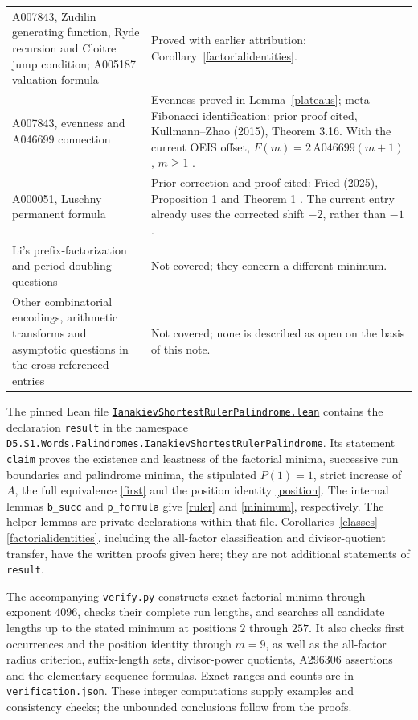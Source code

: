 \documentclass[11pt]{article}
\begin{document}
\begin{longtable}{@{}p{}p{}@{}}
A007843, Zudilin generating function, Ryde recursion and Cloitre jump
condition; A005187 valuation formula
& Proved with earlier attribution: Corollary~\ref{factorialidentities}.\\
A007843, evenness and A046699 connection
& Evenness proved in Lemma~\ref{plateaus}; meta-Fibonacci identification:
prior proof cited, Kullmann--Zhao (2015), Theorem 3.16.
With the current OEIS offset, $F(m)=2\,\mathrm{A046699}(m+1)$,
$m\ge1$ \cite{oeisF}.\\
A000051, Luschny permanent formula
& Prior correction and proof cited: Fried (2025), Proposition 1
and Theorem 1 \cite{friedPermanent}. The current entry already
uses the corrected shift $-2$, rather than $-1$.\\
Li's prefix-factorization and period-doubling questions
& Not covered; they concern a different minimum.\\
Other combinatorial encodings, arithmetic transforms and asymptotic
questions in the cross-referenced entries
& Not covered; none is described as open on the basis of this note.\\
\bottomrule
\end{longtable}
\normalsize

The pinned Lean file
\href{https://github.com/the-omega-institute/trureturing/blob/3afaecc5507038586e39d8775afe7c0df3d4fc48/D5/S1/Words/Palindromes/IanakievShortestRulerPalindrome.lean}{\texttt{IanakievShortestRulerPalindrome.lean}}
contains the declaration \texttt{result} in the namespace
\texttt{D5.S1.Words.Palindromes.IanakievShortestRulerPalindrome}.
Its statement \texttt{claim} proves the existence and leastness of the
factorial minima, successive run boundaries and palindrome minima,
the stipulated $P(1)=1$, strict increase of $A$, the full equivalence
\eqref{first} and the position identity \eqref{position}.
The internal lemmas \texttt{b\_succ} and \texttt{p\_formula} give
\eqref{ruler} and \eqref{minimum}, respectively.
The helper lemmas are private declarations within that file.
Corollaries~\ref{classes}--\ref{factorialidentities}, including the
all-factor classification and divisor-quotient transfer, have the
written proofs given here; they are not additional statements of
\texttt{result}.

The accompanying \texttt{verify.py} constructs exact factorial minima
through exponent $4096$, checks their complete run lengths, and searches
all candidate lengths up to the stated minimum at positions $2$ through
$257$. It also checks first occurrences and the position identity
through $m=9$, as well as the all-factor radius criterion, suffix-length
sets, divisor-power quotients, A296306 assertions and the elementary
sequence formulas. Exact ranges and counts are in
\texttt{verification.json}. These integer computations supply examples
and consistency checks; the unbounded conclusions follow from the proofs.
\end{document}
